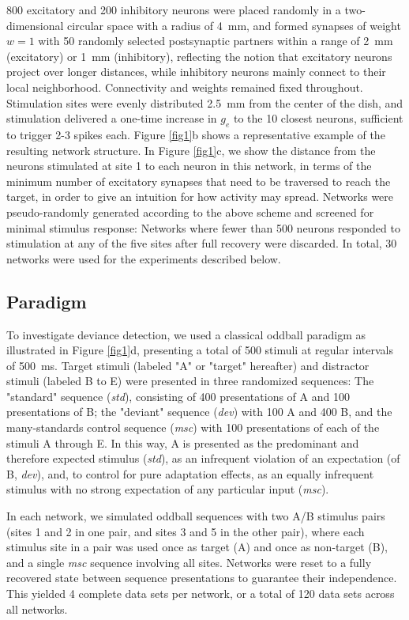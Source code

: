 \documentclass[pdflatex,referee,iicol,sn-basic]{sn-jnl}
\newcommand{\dev}{\textit{dev}}
\newcommand{\msc}{\textit{msc}}
\newcommand{\std}{\textit{std}}
\newcommand{\refpanel}[2]{Figure \ref{fig#1}\lowercase{#2}}
\begin{document}
800 excitatory and 200 inhibitory neurons were placed randomly in a two-dimensional circular space with a radius of 4~mm, and formed synapses of weight $w = 1$ with 50 randomly selected postsynaptic partners within a range of 2~mm (excitatory) or 1~mm (inhibitory), reflecting the notion that excitatory neurons project over longer distances, while inhibitory neurons mainly connect to their local neighborhood. Connectivity and weights remained fixed throughout. Stimulation sites were evenly distributed 2.5~mm from the center of the dish, and stimulation delivered a one-time increase in $g_e$ to the 10 closest neurons, sufficient to trigger 2-3 spikes each. \refpanel{1}{b} shows a representative example of the resulting network structure. In \refpanel{1}{c}, we show the distance from the neurons stimulated at site 1 to each neuron in this network, in terms of the minimum number of excitatory synapses that need to be traversed to reach the target, in order to give an intuition for how activity may spread. Networks were pseudo-randomly generated according to the above scheme and screened for minimal stimulus response: Networks where fewer than 500 neurons responded to stimulation at any of the five sites after full recovery were discarded. In total, 30 networks were used for the experiments described below.

\subsection{Paradigm}\label{sec-paradigm}

To investigate deviance detection, we used a classical oddball paradigm as illustrated in \refpanel{1}{d}, presenting a total of 500 stimuli at regular intervals of 500~ms. Target stimuli (labeled "A" or "target" hereafter) and distractor stimuli (labeled B to E) were presented in three randomized sequences: The "standard" sequence (\std{}), consisting of 400 presentations of A and 100 presentations of B; the "deviant" sequence (\dev{}) with 100 A and 400 B, and the many-standards control sequence (\msc{}) with 100 presentations of each of the stimuli A through E. In this way, A is presented as the predominant and therefore expected stimulus (\std{}), as an infrequent violation of an expectation (of B, \dev{}), and, to control for pure adaptation effects, as an equally infrequent stimulus with no strong expectation of any particular input (\msc{}).

In each network, we simulated oddball sequences with two A/B stimulus pairs (sites 1 and 2 in one pair, and sites 3 and 5 in the other pair), where each stimulus site in a pair was used once as target (A) and once as non-target (B), and a single \msc{} sequence involving all sites. Networks were reset to a fully recovered state between sequence presentations to guarantee their independence. This yielded 4 complete data sets per network, or a total of 120 data sets across all networks.
\end{document}
